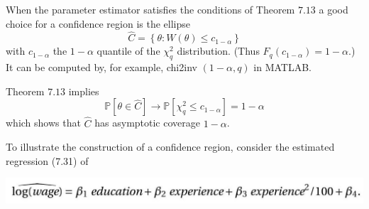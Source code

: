 \documentclass[10pt]{article}
\begin{document}
When the parameter estimator satisfies the conditions of Theorem $7.13$ a good choice for a confidence region is the ellipse
$$
\widehat{C}=\left\{\theta: W(\theta) \leq c_{1-\alpha}\right\}
$$
with $c_{1-\alpha}$ the $1-\alpha$ quantile of the $\chi_{q}^{2}$ distribution. (Thus $F_{q}\left(c_{1-\alpha}\right)=1-\alpha$.) It can be computed by, for example, chi2inv $(1-\alpha, q)$ in MATLAB.

Theorem $7.13$ implies
$$
\mathbb{P}[\theta \in \widehat{C}] \rightarrow \mathbb{P}\left[\chi_{q}^{2} \leq c_{1-\alpha}\right]=1-\alpha
$$
which shows that $\widehat{C}$ has asymptotic coverage $1-\alpha$.

To illustrate the construction of a confidence region, consider the estimated regression (7.31) of

\includegraphics[max width=\textwidth]{2022_09_17_4fdd33cd9a12f3020189g-24}
\end{document}
